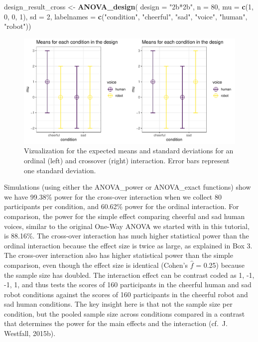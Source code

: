 \documentclass[
  english,
  ,jou,floatsintext]{apa6}
\newenvironment{Shaded}{\begin{snugshade}}{\end{snugshade}}
\newcommand{\DataTypeTok}[1]{\textcolor[rgb]{0.13,0.29,0.53}{#1}}
\newcommand{\DecValTok}[1]{\textcolor[rgb]{0.00,0.00,0.81}{#1}}
\newcommand{\KeywordTok}[1]{\textcolor[rgb]{0.13,0.29,0.53}{\textbf{#1}}}
\newcommand{\NormalTok}[1]{#1}
\newcommand{\StringTok}[1]{\textcolor[rgb]{0.31,0.60,0.02}{#1}}
\begin{document}
\begin{Shaded}
\begin{Highlighting}[]
\NormalTok{design_result_cross <-}\StringTok{ }\KeywordTok{ANOVA_design}\NormalTok{(}
 \DataTypeTok{design =} \StringTok{"2b*2b"}\NormalTok{, }\DataTypeTok{n =} \DecValTok{80}\NormalTok{, }
 \DataTypeTok{mu =} \KeywordTok{c}\NormalTok{(}\DecValTok{1}\NormalTok{, }\DecValTok{0}\NormalTok{, }\DecValTok{0}\NormalTok{, }\DecValTok{1}\NormalTok{), }\DataTypeTok{sd =} \DecValTok{2}\NormalTok{,}
 \DataTypeTok{labelnames =} \KeywordTok{c}\NormalTok{(}\StringTok{"condition"}\NormalTok{, }
                \StringTok{"cheerful"}\NormalTok{, }\StringTok{"sad"}\NormalTok{, }
                \StringTok{"voice"}\NormalTok{, }
                \StringTok{"human"}\NormalTok{, }\StringTok{"robot"}\NormalTok{))}
\end{Highlighting}
\end{Shaded}

\begin{figure}
\centering
\includegraphics{0.1_Simulation_Based_Power_Analysis_For_Factorial_ANOVA_Designs_files/figure-latex/mean-plot-1.pdf}
\caption{\label{fig:mean-plot}Vizualization for the expected means and standard deviations for an ordinal (left) and crossover (right) interaction. Error bars represent one standard deviation.}
\end{figure}

Simulations (using either the ANOVA\_power or ANOVA\_exact functions) show we have 99.38\% power for the cross-over interaction when we collect 80 participants per condition, and 60.62\% power for the ordinal interaction.
For comparison, the power for the simple effect comparing cheerful and sad human voices, similar to the original One-Way ANOVA we started with in this tutorial, is 88.16\%.
The cross-over interaction has much higher statistical power than the ordinal interaction because the effect size is twice as large, as explained in Box 3.
The cross-over interaction also has higher statistical power than the simple comparison, even though the effect size is identical (Cohen's \(\hat f\) = 0.25) because the sample size has doubled.
The interaction effect can be contrast coded as 1, -1, -1, 1, and thus tests the scores of 160 participants in the cheerful human and sad robot conditions against the scores of 160 participants in the cheerful robot and sad human conditions.
The key insight here is that not the sample size per condition, but the pooled sample size across conditions compared in a contrast that determines the power for the main effects and the interaction (cf.~J. Westfall, 2015b).
\end{document}

